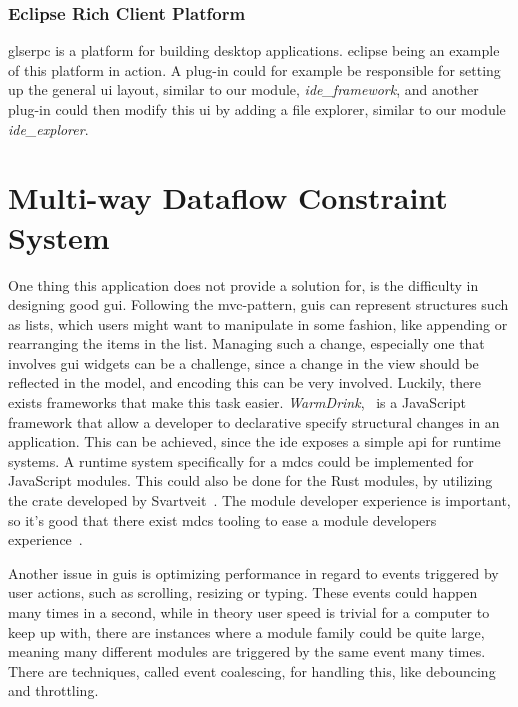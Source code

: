 \subsubsection{Eclipse Rich Client Platform}
\*gls{erpc} is a platform for building desktop applications. \gls*{eclipse}
being an example of this platform in action. A plug-in could for example be
responsible for setting up the general \gls*{ui} layout, similar to our module,
\textit{ide\_framework}, and another plug-in could then modify this \gls*{ui} by
adding a file explorer, similar to our module \textit{ide\_explorer}.


\section{Multi-way Dataflow Constraint System} \label{sec:mdcs}

One thing this application does not provide a solution for, is the difficulty
in designing good \gls*{gui}. Following the \gls*{mvc}-pattern, \gls*{gui}s can
represent structures such as lists, which users might want to manipulate in
some fashion, like appending or rearranging the items in the list. Managing such
a change, especially one that involves \gls*{gui} widgets can be a challenge,
since a change in the view should be reflected in the model, and encoding this
can be very involved. Luckily, there exists frameworks that make this task
easier. \textit{WarmDrink},~\cite{warmDrink, dslMdcs} is a JavaScript
framework that allow a developer to declarative specify structural changes in
an application. This can be achieved, since the \gls*{ide} exposes a simple
\gls*{api} for runtime systems. A runtime system specifically for a \gls*{mdcs}
could be implemented for JavaScript modules. This could also be done for the
Rust modules, by utilizing the crate developed by Svartveit~\cite{mcdsRust}.
The module developer experience is important, so it's good that there exist
\gls*{mdcs} tooling to ease a module developers experience~\cite{toolMcds}.

Another issue in \gls*{gui}s is optimizing performance in regard to events
triggered by user actions, such as scrolling, resizing or typing. These events
could happen many times in a second, while in theory user speed is trivial for a
computer to keep up with, there are instances where a module family could be
quite large, meaning many different modules are triggered by the same event many
times. There are techniques, called event coalescing, for handling this, like
debouncing and throttling.

